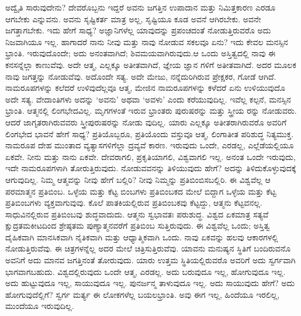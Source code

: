 ಅದ್ವೈತಿ ಸಾರುವುದೇನು? ದೇವರೊಬ್ಬನು ಇದ್ದರೆ ಅವನು ಜಗತ್ತಿನ ಉಪಾದಾನ ಮತ್ತು ನಿಮಿತ್ತಕಾರಣ ಎರಡೂ ಆಗಬೇಕು ಎನ್ನುವನು. ಅವನು ಸೃಷ್ಟಿಕರ್ತ ಮಾತ್ರ ಅಲ್ಲ, ಸೃಷ್ಟಿಯೂ ಕೂಡ ಅವನೆ ಆಗಿರಬೇಕು. ಅವನೇ ಜಗತ್ತಾಗಬೇಕು. ಇದು ಹೇಗೆ ಸಾಧ್ಯ? ಅಜ್ಞಾನಿಗಳೆಲ್ಲ ಯಾವುದನ್ನು ಪ್ರಪಂಚದಂತೆ ನೋಡುತ್ತಿರುವರೊ ಅದು ನಿಜವಾಗಿಯೂ ಇಲ್ಲ. ಹಾಗಾದರೆ ನಾನು ನೀವು ಮತ್ತು ನಾವು ನೋಡುವ ಸಕಲವೂ ಏನು? ಇದು ಕೇವಲ ಮನಸ್ಸಿನ ಭ್ರಾಂತಿ. ಇರುವುದೊಂದೇ; ಅದು ಅನಂತವಾಗಿದೆ; ಶಿವಮಯವಾಗಿರುವುದು.ಆ ಒಂದು ಅಸ್ತಿತ್ವದಲ್ಲಿ ನಾವು ಈ ಕನಸನ್ನೆಲ್ಲಾ ಕಾಣುವೆವು. ಅದೇ ಆತ್ಮ, ಎಲ್ಲಕ್ಕೂ ಅತೀತವಾಗಿದೆ, ಜ್ಞೇಯ ಜ್ಞಾನ ಗಳಿಗೆ ಅತೀತವಾಗಿದೆ. ಅದರ ಮೂಲಕ ನಾವು ಜಗತ್ತನ್ನು ನೋಡುವೆವು. ಅದೊಂದೇ ಸತ್ಯ. ಅದೇ ಮೇಜು, ನನ್ನೆದುರಿಗಿರುವ ಪ್ರೇಕ್ಷಕರ, ಗೋಡೆ ಆಗಿದೆ. ನಾಮರೂಪಗಳನ್ನು ಕಲೆದರೆ ಉಳಿವುದೆಲ್ಲವೂ ಆತ್ಮ, ಮೇಜಿನ ನಾಮರೂಪಗಳನ್ನು ಕಳೆದರೆ ಏನು ಉಳಿಯುವುದೊ ಅದೇ ಸತ್ಯ. ವೇದಾಂತಿಗಳು ಅದನ್ನು ‘ಅವನು’ ಅಥವಾ ‘ಅವಳು’ ಎಂದು ಕರೆಯುವುದಿಲ್ಲ. ಇವೆಲ್ಲ ಕಲ್ಪನೆ, ಮನಸ್ಸಿನ ಭ್ರಾಂತಿ. ಆತ್ಮನಲ್ಲಿ ಲಿಂಗಭೇದವಿಲ್ಲ. ಮೃಗಗಳಂತೆ ಇರುವ ಭ್ರಾಂತರು ಪುರುಷರನ್ನು ಮತ್ತು ಸ್ತ್ರೀಯ ರನ್ನು ನೋಡುವರು. ಆದರೆ ಜಾಗೃತರಾಗಿರುವವರು ಸ್ತ್ರೀಪುರುಷರನ್ನು ನೋಡು ವುದಿಲ್ಲ. ಯಾರು ಎಲ್ಲಕ್ಕೂ ಅತೀತರಾಗಿರುವರೊ ಅವರಿಗೆ ಲಿಂಗಭೇದ ಭಾವನೆ ಹೇಗೆ ಸಾಧ್ಯ? ಪ್ರತಿಯೊಬ್ಬರೂ, ಪ್ರತಿಯೊಂದು ವಸ್ತುವೂ ಆತ್ಮ, ಲಿಂಗಾತೀತ ಪರಿಶುದ್ಧ ನಿತ್ಯಮುಕ್ತ. ನಾಮರೂಪ ದೇಹ ಮುಂತಾದ ವ್ಯತ್ಯಾಸಗಳಿಗೆಲ್ಲಾ ದ್ರವ್ಯವೆ ಕಾರಣ. ಇರುವುದು ಒಂದೇ, ಎರಡಲ್ಲ, ಎಲ್ಲೆಡೆಯಲ್ಲಿಯೂ ಏಕವೇ. ನೀನು ಮತ್ತು ನಾನು ಏಕವೇ. ದೇವರಾಗಲಿ, ಪ್ರಕೃತಿಯಾಗಲಿ, ವಿಶ್ವವಾಗಲಿ ಇಲ್ಲ. ಅನಂತ ಒಂದೇ ಇರುವುದು, ಇದೇ ನಾಮರೂಪಗಳಾಗಿ ತೋರುತ್ತಿರುವುದು. ನೋಡುವವನನ್ನು ತಿಳಿಯುವುದು ಹೇಗೆ? ಅದನ್ನು ತಿಳಿದುಕೊಳ್ಳುವುದಕ್ಕೆ ಆಗುವುದಿಲ್ಲ. ನಿಮ್ಮ ಆತ್ಮವನ್ನು ನೀವು ಹೇಗೆ ಬಲ್ಲಿರಿ? ನೀವು ನಿಮ್ಮನ್ನು ಪ್ರತಿಬಿಂಬಿಸಬಲ್ಲಿರಿ. ಈ ವಿಶ್ವವೆಲ್ಲ ಆ ಪರಮಾತ್ಮನ ಪ್ರತಿಬಿಂಬ. ಒಳ್ಳೆಯ ಮತ್ತು ಕೆಟ್ಟ ಬಿಂಬಗಳು ಪ್ರತಿಬಿಂಬಕದ ಮೇಲೆ ಬಿದ್ದಾಗ ಒಳ್ಳೆಯ ಮತ್ತು ಕೆಟ್ಟ ಪ್ರತಿಬಿಂಬಗಳು ವ್ಯಕ್ತವಾಗುವುವು. ಕೊಲೆ ಪಾತಕಿಯಲ್ಲಿರುವ ಪ್ರತಿಬಿಂಬಕವು ಕೆಟ್ಟದ್ದು, ಆತ್ಮನು ಕೆಟ್ಟವನಲ್ಲ. ಸಾಧುವಿನಲ್ಲಿರುವ ಪ್ರತಿಬಿಂಬವು ಶುದ್ಧವಾದುದು. ಆತ್ಮನು ಸ್ವಭಾವತಃ ಪರುಶುದ್ಧ. ವಿಶ್ವದ ಏಕಮಾತ್ರ ಸತ್ಯವೆ ಕ್ಷುದ್ರತಮಕೀಟದಿಂದ ಶ್ರೇಷ್ಠತಮ ಪುಣ್ಯಾತ್ಮನವರೆಗೆ ಪ್ರತಿಬಿಂಬ ಸುತ್ತಿರುವುದು. ಈ ವಿಶ್ವವೆಲ್ಲ ಒಂದು; ಅಸ್ತಿತ್ವ ದೈಹಿಕವಾಗಿ ಮಾನಸಿಕವಾಗಿ ನೈತಿಕವಾಗಿ ಮತ್ತು ಆಧ್ಯಾತ್ಮಿಕವಾಗಿ ಒಂದು. ನಾವು ಏಕವನ್ನು ಹಲವು ಆಕಾರಗಳಲ್ಲಿ ನೋಡುತ್ತಿರುವೆವು. ಈ ಚಿತ್ರಗಳನ್ನೆಲ್ಲ ಅದರ ಮೇಲೆ ಚಿತ್ರಿಸುತ್ತಿರುವೆವು. ಯಾವನು ಮನುಷ್ಯನ ಸ್ಥಿತಿಗೆ ಬಂದಿರುವನೊ ಅವನಿಗೆ ಅದು ಮಾನವ ಜಗತ್ತಿನಂತೆ ತೋರುವುದು. ಯಾರು ಉತ್ತಮ ಸ್ಥಿತಿಯಲ್ಲಿರುವರೊ ಅವರಿಗೆ ಅದು ಸ್ವರ್ಗವಾಗಿ ಭಾಗವಾಗಬಹುದು. ವಿಶ್ವದಲ್ಲಿರುವುದು ಒಂದೇ ಆತ್ಮ, ಎರಡಲ್ಲ. ಅದು ಬರುವುದೂ ಇಲ್ಲ, ಹೋಗುವುದೂ ಇಲ್ಲ. ಅದು ಹುಟ್ಟುವುದೂ ಇಲ್ಲ, ಸಾಯುವುದೂ ಇಲ್ಲ. ಪುನರ್ಜನ್ಮ ತಾಳುವುದೂ ಇಲ್ಲ. ಅದು ಸಾಯುವುದು ಹೇಗೆ? ಅದು ಹೋಗುವುದೆಲ್ಲಿಗೆ? ಸ್ವರ್ಗ ಮರ್ತ್ಯ ಈ ಲೋಕಗಳೆಲ್ಲ ಬಯಲಭ್ರಾಂತಿ. ಅವು ಈಗ ಇಲ್ಲ, ಹಿಂದೆಯೂ ಇರಲಿಲ್ಲ, ಮುಂದೆಯೂ ಇರುವುದಿಲ್ಲ.

